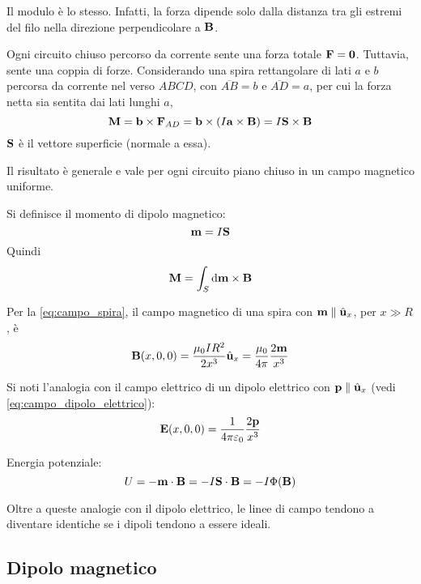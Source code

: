 Il modulo è lo stesso.
Infatti, la forza dipende solo dalla distanza tra gli estremi del filo nella direzione perpendicolare a $\mathbf{B}$.

Ogni circuito chiuso percorso da corrente sente una forza totale $\mathbf{F} = \mathbf{0}$.
Tuttavia, sente una coppia di forze.
Considerando una spira rettangolare di lati $a$ e $b$ percorsa da corrente nel verso $ABCD$, con $\overline{AB} = b$ e $\overline{AD} = a$, per cui la forza netta sia sentita dai lati lunghi $a$,
\begin{equation}
    \mathbf{M} = \mathbf{b} \times \mathbf{F}_{AD} = \mathbf{b} \times \left( I\mathbf{a}  \times \mathbf{B} \right)
    = I \mathbf{S} \times \mathbf{B}
\end{equation}
$\mathbf{S}$ è il vettore superficie (normale a essa).

Il risultato è generale e vale per ogni circuito piano chiuso in un campo magnetico uniforme.

Si definisce il momento di dipolo magnetico:
\begin{equation}
    \mathbf{m} = I \mathbf{S}
\end{equation}
Quindi
\begin{equation}
    \mathbf{M} = \int_S \mathrm{d}\mathbf{m} \times \mathbf{B}
\end{equation}

Per la \eqref{eq:campo_spira}, il campo magnetico di una spira con $\mathbf{m} \parallel \hat{\mathbf{u}}_{x}$, per $x \gg R$, è
\begin{equation}
    \mathbf{B}(x, 0, 0) = \frac{\mu_0 I R^2}{2 x^3} \hat{\mathbf{u}}_{x} = \frac{\mu_0}{4\pi} \frac{2\mathbf{m}}{x^3}
\end{equation}

Si noti l'analogia con il campo elettrico di un dipolo elettrico con $\mathbf{p} \parallel \hat{\mathbf{u}}_{x}$ (vedi \eqref{eq:campo_dipolo_elettrico}):
\begin{equation}
    \mathbf{E}(x, 0, 0) = \frac{1}{4\pi\varepsilon_0} \frac{2\mathbf{p}}{x^3}
\end{equation}

Energia potenziale:
\begin{equation}
    U = - \mathbf{m} \cdot \mathbf{B} = - I \mathbf{S} \cdot \mathbf{B} = -I \Phi(\mathbf{B})
\end{equation}

Oltre a queste analogie con il dipolo elettrico, le linee di campo tendono a diventare identiche se i dipoli tendono a essere ideali.


\subsection{Dipolo magnetico}

